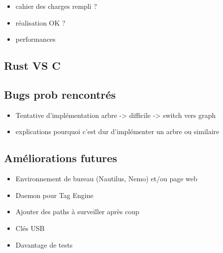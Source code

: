 \begin{itemize}
    \item cahier des charges rempli ?
    \item réalisation OK ?
    \item performances
\end{itemize}
\subsection{Rust VS C}
\subsection{Bugs prob rencontrés}
\begin{itemize}
    \item Tentative d'implémentation arbre -> difficile -> switch vers graph 
    \item explications pourquoi c'est dur d'implémenter un arbre ou similaire \cite{ref2}
        \cite{ref26} \cite{ref46} \cite{ref47} \cite{ref48} \cite{ref49} \cite{ref50}
\end{itemize}
\subsection{Améliorations futures}
\begin{itemize}
    \item Environnement de bureau (Nautilus, Nemo) et/ou page web
    \item Daemon pour Tag Engine
    \item Ajouter des paths à surveiller après coup
    \item Clés USB
    \item Davantage de tests
\end{itemize}
